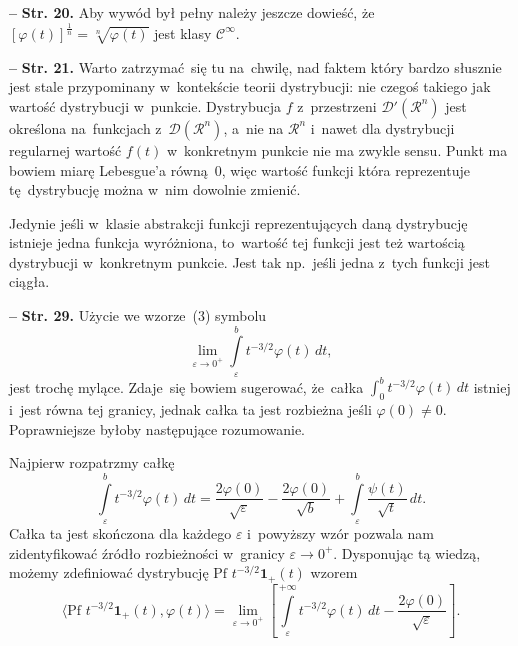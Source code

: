 \documentclass[a4paper,11pt]{article}
\newcommand{\spaceThree}{0.5em}
\newcommand{\fr}{\frac}
\newcommand{\mr}{\mathrm}
\newcommand{\mc}{\mathcal}
\newcommand{\mbf}{\mathbf}
\newcommand{\ra}{\rightarrow}
\newcommand{\veps}{\varepsilon}
\newcommand{\vp}{\varphi}
\newcommand{\D}{\mc{D}}
\newcommand{\Rc}{\mc{R}}
\newcommand{\Cc}{\mc{C}}
\newcommand{\Lim}{\lim\limits}
\newcommand{\Cinfty}{\Cc^{ \infty }}
\newcommand{\Int}{\int\limits}
\newcommand{\lket}{\langle}
\newcommand{\rket}{\rangle}
\newcommand{\tb}{\textbf}
\newcommand{\noi}{\noindent}
\newcommand{\start}{\noi \tb{--} {}}
\newcommand{\Str}[1]{\tb{Str. #1.}}
\newcommand{\Pf}{\mr{Pf}\,}
\newcommand{\Rnc}{\Rc^{ n }}
\newcommand{\Hevp}{\mbf{1}_{ + }} %
\begin{document}
\vspace{\spaceThree}


\start \Str{20} Aby wywód był pełny należy jeszcze dowieść,
że~$[ \vp( t ) ]^{ \fr{ 1 }{ n } } = \sqrt[ n ]{ \vp( t ) }$ jest
klasy $\Cinfty$.

\vspace{\spaceThree}


\start \Str{21} Warto zatrzymać~się tu na~chwilę, nad faktem który
bardzo słusznie jest stale przypominany w~kontekście teorii
dystrybucji: nie czegoś takiego jak wartość dystrybucji w~punkcie.
Dystrybucja $f$ z~przestrzeni $\D'( \Rnc )$ jest określona
na~funkcjach z~$\D( \Rnc )$, a~nie na $\Rnc$ i~nawet dla dystrybucji
regularnej wartość $f( t )$ w~konkretnym punkcie nie ma zwykle sensu.
Punkt ma bowiem miarę Lebesgue'a równą~0, więc wartość funkcji która
reprezentuje tę~dystrybucję można w~nim dowolnie zmienić.

Jedynie jeśli w~klasie abstrakcji funkcji reprezentujących daną
dystrybucję istnieje jedna funkcja wyróżniona, to~wartość tej funkcji
jest też wartością dystrybucji w~konkretnym punkcie. Jest tak
np.~jeśli jedna z~tych funkcji jest ciągła.

\vspace{\spaceThree}


\start \Str{29} Użycie we wzorze~(3) symbolu
\begin{equation}
  \label{eq:Zem-s01-01}
  \Lim_{ \veps \ra 0^{ + } } \Int_{ \veps }^{ b } t^{ -3/2 } \vp( t ) \, dt,
\end{equation}
jest trochę mylące. Zdaje~się bowiem sugerować, że~całka
$\int_{ 0 }^{ b } t^{ -3/2 } \vp( t ) \, dt$ istniej i~jest równa tej
granicy, jednak całka ta jest rozbieżna jeśli $\vp( 0 ) \neq 0$.
Poprawniejsze byłoby następujące rozumowanie.

Najpierw rozpatrzmy całkę
\begin{equation}
  \label{eq:Zem-s01-02}
  \Int_{ \veps }^{ b } t^{ -3/2 } \vp( t ) \, dt
  = \fr{ 2 \vp( 0 ) }{ \sqrt{ \veps } } - \fr{ 2 \vp( 0 ) }{ \sqrt{ b } }
  + \Int_{ \veps }^{ b } \fr{ \psi( t ) }{ \sqrt{ t } } \, dt.
\end{equation}
Całka ta jest skończona dla każdego $\veps$ i~powyższy wzór pozwala
nam zidentyfikować źródło rozbieżności w~granicy $\veps \ra 0^{ + }$.
Dysponując tą wiedzą, możemy zdefiniować dystrybucję
$\Pf \, t^{ -3/2 } \Hevp( t )$ wzorem
\begin{equation}
  \label{eq:Zem-s01-03}
  \lket \Pf \, t^{ -3/2 } \Hevp( t ), \vp( t ) \rket = \Lim_{ \veps \ra 0^{ + } }
  \left[ \Int_{ \veps }^{ +\infty } t^{ -3/2 } \vp( t ) \, dt
    - \fr{ 2 \vp( 0 ) }{ \sqrt{ \veps } } \right].
\end{equation}
\end{document}
